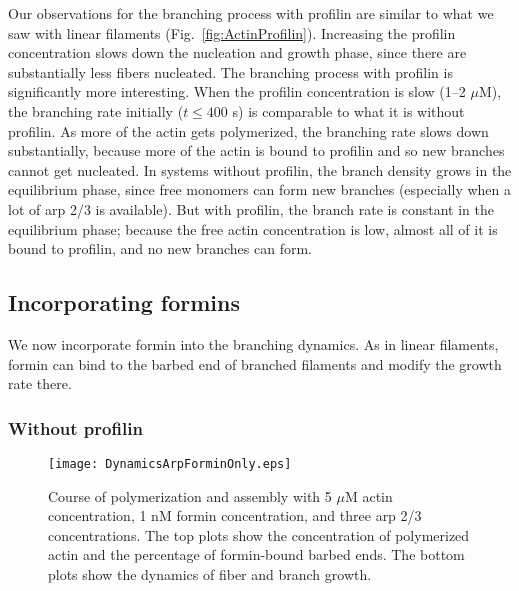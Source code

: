\documentclass[11pt]{article}
\begin{document}
Our observations for the branching process with profilin are similar to what we saw with linear filaments (Fig.\ \ref{fig:ActinProfilin}). Increasing the profilin concentration slows down the nucleation and growth phase, since there are substantially less fibers nucleated. The branching process with profilin is significantly more interesting. When the profilin concentration is slow (1--2 $\mu$M), the branching rate initially ($t \leq 400$ s) is comparable to what it is without profilin. As more of the actin gets polymerized, the branching rate slows down substantially, because more of the actin is bound to profilin and so new branches cannot get nucleated. In systems without profilin, the branch density grows in the equilibrium phase, since free monomers can form new branches (especially when a lot of arp 2/3 is available). But with profilin, the branch rate is constant in the equilibrium phase; because the free actin concentration is low, almost all of it is bound to profilin, and no new branches can form. 

\subsection{Incorporating formins}
We now incorporate formin into the branching dynamics. As in linear filaments, formin can bind to the barbed end of branched filaments and modify the growth rate there. 

\subsubsection{Without profilin}
\begin{figure}
\centering
\texttt{[image: DynamicsArpForminOnly.eps]}
\caption{\label{fig:ArpFormin}Course of polymerization and assembly with 5 $\mu$M actin concentration, 1 nM formin concentration, and three arp 2/3 concentrations. The top plots show the concentration of polymerized actin and the percentage of formin-bound barbed ends. The bottom plots show the dynamics of fiber and branch growth. }
\end{figure}
\end{document}
